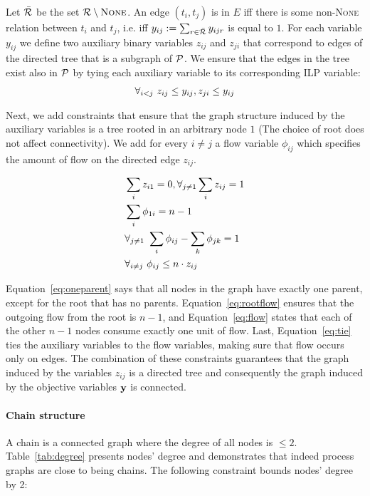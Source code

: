  Let $\bar{\mathcal{R}}$ be the set $\mathcal{R} \setminus \mbox{\textsc{None}}$. An edge $(t_i,t_j)$ is in $E$ iff there is some non-\textsc{None} relation between $t_i$ and $t_j$, i.e. iff $y_{ij}:=\sum_{r \in \bar{\mathcal{R}}} y_{ijr}$ is equal to $1$. For each variable $y_{ij}$ we define two auxiliary binary variables $z_{ij}$ and $z_{ji}$ that correspond to edges of the directed tree that is a subgraph of $\mathcal{P}$. We ensure that the edges in the tree exist also in $\mathcal{P}$ by tying each auxiliary variable to its corresponding ILP variable:
\begin{align}
\vspace{-5mm}
\forall_{i<j} \ z_{ij} \leq y_{ij}, z_{ji} \leq y_{ij}
\vspace{-5mm}
\end{align}

Next, we add constraints that ensure that the graph structure induced by the auxiliary variables is a tree rooted in an arbitrary node $1$ (The choice of root does not affect connectivity). We add for every $i \neq j$ a flow variable $\phi_{ij}$ which specifies the amount of flow on the directed edge $z_{ij}$.

\begin{align}
\vspace{-30pt}
\small &\sum_{i} z_{i1} =0, \forall_{j \neq 1} \sum_{i} z_{ij}=1 \label{eq:oneparent} \\ 
&\sum_{i} \phi_{1i}=n-1 \label{eq:rootflow} \\ 
&\forall_{j \neq 1} \ \sum_{i} \phi_{ij} - \sum_{k} \phi_{jk}=1 \label{eq:flow} \\
&\forall_{i \neq j} \ \phi_{ij} \leq n \cdot z_{ij} \label{eq:tie} 
\end{align}

Equation~\ref{eq:oneparent} says that all nodes in the graph have exactly one parent, except for the root that has no parents. Equation~\ref{eq:rootflow} ensures that the outgoing flow from the root is $n-1$, and Equation~\ref{eq:flow} states that each of the other $n-1$ nodes consume exactly one unit of flow. Last, Equation~\ref{eq:tie} ties the auxiliary variables to the flow variables, making sure that flow occurs only on edges. The combination of these constraints guarantees that the graph induced by the variables $z_{ij}$ is a directed tree and consequently the graph induced by the objective variables $\mathbf{y}$ is connected.

\paragraph{Chain structure} 
A chain is a connected graph where the degree of all nodes is $\leq 2$. Table~\ref{tab:degree} presents nodes' degree and demonstrates that indeed process graphs are close to being chains. The following constraint bounds nodes' degree by 2:

